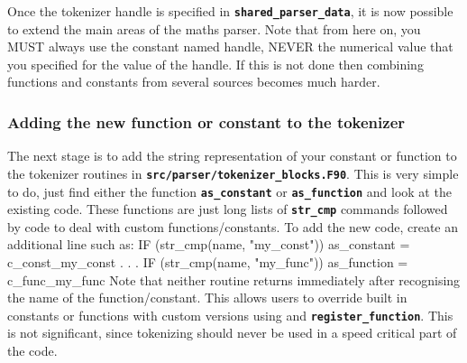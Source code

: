 \documentclass[12pt,a4paper]{article}
\newcommand{\inlinecode}[1]{{\color{warwickred} \bf\texttt{#1}}}
\newenvironment{boxverbatim}{\lboxverbatim{none}}{\endlboxverbatim}
\begin{document}
Once the tokenizer handle is specified in \inlinecode{shared\_parser\_data}, it
is now possible to extend the main areas of the maths parser. Note that from
here on, you MUST always use the constant named handle, NEVER the numerical
value that you specified for the value of the handle. If this is not done
then combining functions and constants from several sources becomes much harder.

\subsubsection{Adding the new function or constant to the tokenizer}
The next stage is to add the string representation of your constant or function
to the tokenizer routines in
\inlinecode{src/parser/tokenizer\_blocks.F90}. This is very simple to do, just
find either the function \inlinecode{as\_constant} or \inlinecode{as\_function}
and look at the existing code. These functions are just long lists of
\inlinecode{str\_cmp} commands followed by code to deal with custom
functions/constants. To add the new code, create an additional line such as:
\begin{boxverbatim}
  IF (str_cmp(name, "my_const")) as_constant = c_const_my_const
  .
  .
  .
  IF (str_cmp(name, "my_func"))  as_function = c_func_my_func
\end{boxverbatim}
Note that neither routine returns immediately after recognising the name of the
function/constant. This allows users to override built in constants or
functions with custom versions using\linebreak \inlinecode{register\_constant}
and \inlinecode{register\_function}. This is not significant, since tokenizing
should never be used in a speed critical part of the code.
\end{document}
